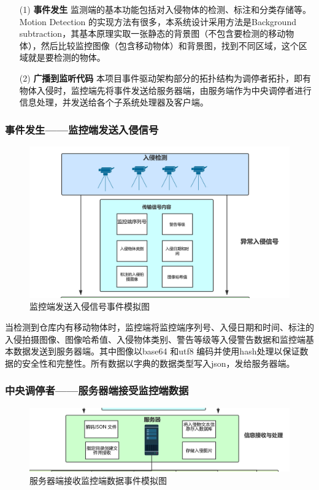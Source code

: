 \documentclass[article]{BJTU-thesis}
\begin{document}
\begin{enumerate}
\item[(1)] \textbf{事件发生} 监测端的基本功能包括对入侵物体的检测、标注和分类存储等。Motion Detection 的实现方法有很多，本系统设计采用方法是Background subtraction，其基本原理实取一张静态的背景图（不包含要检测的移动物体），然后比较监控图像（包含移动物体）和背景图，找到不同区域，这个区域就是要检测的物体。

\item[(2)] \textbf{广播到监听代码} 本项目事件驱动架构部分的拓扑结构为调停者拓扑，即有物体入侵时，监控端先将事件发送给服务器端，由服务端作为中央调停者进行信息处理，并发送给各个子系统处理器及客户端。
\end{enumerate}

\subsubsection{事件发生——监控端发送入侵信号}
\begin{figure}[!htbp]
	\centering
	\includegraphics[scale=.25]{img/t3.png}
		\caption{监控端发送入侵信号事件模拟图}
\end{figure}

当检测到仓库内有移动物体时，监控端将监控端序列号、入侵日期和时间、标注的入侵拍摄图像、图像哈希值、入侵物体类别、警告等级等入侵警告数据和监控端基本数据发送到服务器端。其中图像以base64 和utf8 编码并使用hash处理以保证数据的安全性和完整性。所有数据以字典的数据类型写入json，发给服务器端。

\newpage 
\subsubsection{中央调停者——服务器端接受监控端数据}
\begin{figure}[!htbp]
	\centering
	\includegraphics[scale=.25]{img/t4.png}
	\caption{服务器端接收监控端数据事件模拟图}
\end{figure}
\end{document}
